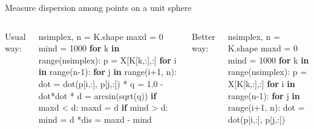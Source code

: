 \documentclass[10pt,ignorenonframetext,serif,onlymath]{beamer}
\newenvironment{Shaded}{}{}
\newcommand{\BuiltInTok}[1]{#1}
\newcommand{\ControlFlowTok}[1]{\textcolor[rgb]{0.00,0.44,0.13}{\textbf{#1}}}
\newcommand{\DecValTok}[1]{\textcolor[rgb]{0.25,0.63,0.44}{#1}}
\newcommand{\FloatTok}[1]{\textcolor[rgb]{0.25,0.63,0.44}{#1}}
\newcommand{\KeywordTok}[1]{\textcolor[rgb]{0.00,0.44,0.13}{\textbf{#1}}}
\newcommand{\NormalTok}[1]{#1}
\newcommand{\OperatorTok}[1]{\textcolor[rgb]{0.40,0.40,0.40}{#1}}
\begin{document}
\begin{frame}[fragile]{Measure dispersion among points on a unit sphere}
\protect\hypertarget{sec:measure-dispersion-among-points-on-a-unit-sphere}{}

\begin{columns}

Usual way:

\scriptsize

\begin{Shaded}
\begin{Highlighting}[]
\NormalTok{nsimplex, n }\OperatorTok{=}\NormalTok{ K.shape}
\NormalTok{maxd }\OperatorTok{=} \DecValTok{0}
\NormalTok{mind }\OperatorTok{=} \DecValTok{1000}
\ControlFlowTok{for}\NormalTok{ k }\KeywordTok{in} \BuiltInTok{range}\NormalTok{(nsimplex):}
\NormalTok{  p }\OperatorTok{=}\NormalTok{ X[K[k,:],:]}
  \ControlFlowTok{for}\NormalTok{ i }\KeywordTok{in} \BuiltInTok{range}\NormalTok{(n}\DecValTok{-1}\NormalTok{):}
    \ControlFlowTok{for}\NormalTok{ j }\KeywordTok{in} \BuiltInTok{range}\NormalTok{(i}\OperatorTok{+}\DecValTok{1}\NormalTok{, n):}
\NormalTok{      dot }\OperatorTok{=}\NormalTok{ dot(p[i,:], p[j,:])}
\OperatorTok{*}\NormalTok{     q }\OperatorTok{=} \FloatTok{1.0} \OperatorTok{-}\NormalTok{ dot}\OperatorTok{*}\NormalTok{dot}
\OperatorTok{*}\NormalTok{     d }\OperatorTok{=}\NormalTok{ arcsin(sqrt(q))}
      \ControlFlowTok{if}\NormalTok{ maxd }\OperatorTok{<}\NormalTok{ d:}
\NormalTok{        maxd }\OperatorTok{=}\NormalTok{ d}
      \ControlFlowTok{if}\NormalTok{ mind }\OperatorTok{>}\NormalTok{ d:}
\NormalTok{        mind }\OperatorTok{=}\NormalTok{ d}
\OperatorTok{*}\NormalTok{dis }\OperatorTok{=}\NormalTok{ maxd }\OperatorTok{-}\NormalTok{ mind}
\end{Highlighting}
\end{Shaded}


Better way:

\scriptsize

\begin{Shaded}
\begin{Highlighting}[]
\NormalTok{nsimplex, n }\OperatorTok{=}\NormalTok{ K.shape}
\NormalTok{maxd }\OperatorTok{=} \DecValTok{0}
\NormalTok{mind }\OperatorTok{=} \DecValTok{1000}
\ControlFlowTok{for}\NormalTok{ k }\KeywordTok{in} \BuiltInTok{range}\NormalTok{(nsimplex):}
\NormalTok{  p }\OperatorTok{=}\NormalTok{ X[K[k,:],:]}
  \ControlFlowTok{for}\NormalTok{ i }\KeywordTok{in} \BuiltInTok{range}\NormalTok{(n}\DecValTok{-1}\NormalTok{):}
    \ControlFlowTok{for}\NormalTok{ j }\KeywordTok{in} \BuiltInTok{range}\NormalTok{(i}\OperatorTok{+}\DecValTok{1}\NormalTok{, n):}
\NormalTok{      dot }\OperatorTok{=}\NormalTok{ dot(p[i,:], p[j,:])}


\end{Highlighting}
\end{Shaded}
\end{columns}
\end{frame}
\end{document}
